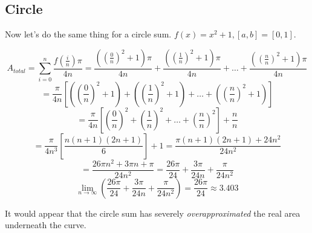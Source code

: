 \documentclass{article}
\begin{document}
    \subsection{Circle}
      Now let's do the same thing for a circle sum. \( f(x) = x^2 + 1, [a,b] = [0,1]\).

      \[ A_{total} = \displaystyle\sum_{i=0}^n \frac{f(\frac{i}{n})\pi}{4n} = \frac{\left((\frac{0}{n})^2+1\right)\pi}{4n} + \frac{\left((\frac{1}{n})^2+1\right)\pi}{4n} + \dots + \frac{\left((\frac{n}{n})^2+1\right)\pi}{4n} \]
      \[ = \frac{\pi}{4n}\left[ \left( \left(\frac{0}{n}\right)^2 + 1 \right) + \left( \left(\frac{1}{n}\right)^2 + 1 \right) + \dots + \left( \left(\frac{n}{n}\right)^2 + 1 \right) \right] \]
      \[ = \frac{\pi}{4n}\left[ \left( \frac{0}{n} \right)^2 + \left( \frac{1}{n} \right)^2 + \dots + \left( \frac{n}{n} \right)^2 \right] + \frac{n}{n} \]
      \[ = \frac{\pi}{4n^3}\left[ \frac{n(n+1)(2n+1)}{6} \right] + 1 = \frac{\pi(n+1)(2n+1) + 24n^2}{24n^2} \]
      \[ = \frac{26\pi n^2+3\pi n+\pi}{24n^2} = \frac{26\pi}{24} + \frac{3\pi}{24n} + \frac{\pi}{24n^2} \]
      \[ \displaystyle \lim_{n \to \infty}\left(\frac{26\pi}{24} + \frac{3\pi}{24n} + \frac{\pi}{24n^2}\right) = \frac{26\pi}{24} \approx 3.403 \]

      It would appear that the circle sum has severely \emph{overapproximated} the real area underneath the curve.
\end{document}
